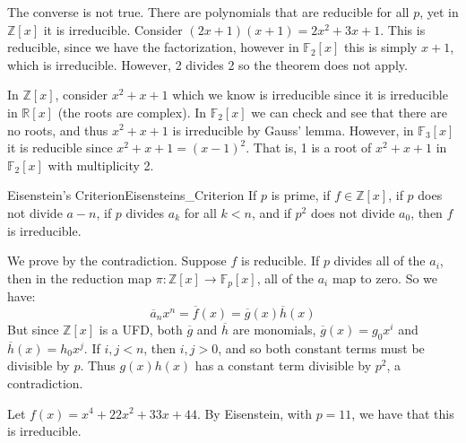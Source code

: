         \begin{example}
            The converse is not true. There are polynomials that are
            reducible for all $p$, yet in $\mathbb{Z}[x]$ it is irreducible.
            Consider $(2x+1)(x+1)=2x^{2}+3x+1$. This is reducible, since
            we have the factorization, however in $\mathbb{F}_{2}[x]$ this
            is simply $x+1$, which is irreducible. However, 2 divides 2 so
            the theorem does not apply.
        \end{example}
        \begin{example}
            In $\mathbb{Z}[x]$, consider $x^{2}+x+1$ which we know is
            irreducible since it is irreducible in $\mathbb{R}[x]$
            (the roots are complex). In $\mathbb{F}_{2}[x]$ we can check and
            see that there are no roots, and thus $x^{2}+x+1$ is irreducible
            by Gauss' lemma. However, in $\mathbb{F}_{3}[x]$ it is reducible
            since $x^{2}+x+1=(x-1)^{2}$. That is, 1 is a root of $x^{2}+x+1$
            in $\mathbb{F}_{2}[x]$ with multiplicity 2.
        \end{example}
        \begin{ftheorem}{Eisenstein's Criterion}{Eisensteins_Criterion}
            If $p$ is prime, if $f\in\mathbb{Z}[x]$, if $p$ does not divide
            $a-{n}$, if $p$ divides $a_{k}$ for all $k<n$, and if
            $p^{2}$ does not divide $a_{0}$, then $f$ is irreducible.
        \end{ftheorem}
        \begin{bproof}
            We prove by the contradiction. Suppose $f$ is reducible.
            If $p$ divides all of the $a_{i}$, then in the reduction map
            $\pi:\mathbb{Z}[x]\rightarrow\mathbb{F}_{p}[x]$, all of the
            $a_{i}$ map to zero. So we have:
            \begin{equation}
                \overline{a}_{n}x^{n}=\overline{f}(x)
                =\overline{g}(x)\overline{h}(x)
            \end{equation}
            But since $\mathbb{Z}[x]$ is a UFD, both $\overline{g}$ and
            $\overline{h}$ are monomials, $\overline{g}(x)=g_{0}x^{i}$ and
            $\overline{h}(x)=h_{0}x^{j}$. If $i,j<n$, then $i,j>0$, and so
            both constant terms must be divisible by $p$. Thus
            $g(x)h(x)$ has a constant term divisible by $p^{2}$, a
            contradiction.
        \end{bproof}
        \begin{example}
            Let $f(x)=x^{4}+22x^{2}+33x+44$. By Eisenstein, with $p=11$, we
            have that this is irreducible.
        \end{example}
